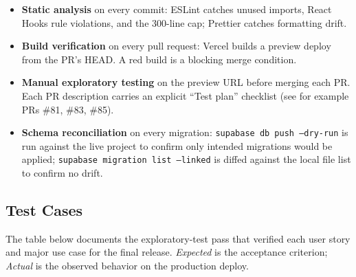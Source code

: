 \documentclass[11pt,letterpaper]{article}
\begin{document}
\begin{itemize}[noitemsep]
  \item \textbf{Static analysis} on every commit: ESLint catches
        unused imports, React Hooks rule violations, and the
        300-line cap; Prettier catches formatting drift.
  \item \textbf{Build verification} on every pull request: Vercel
        builds a preview deploy from the PR's HEAD. A red build is
        a blocking merge condition.
  \item \textbf{Manual exploratory testing} on the preview URL
        before merging each PR. Each PR description carries an
        explicit ``Test plan'' checklist (see for example PRs
        \#81, \#83, \#85).
  \item \textbf{Schema reconciliation} on every migration:
        \texttt{supabase db push --dry-run} is run against the
        live project to confirm only intended migrations would be
        applied; \texttt{supabase migration list --linked} is
        diffed against the local file list to confirm no drift.
\end{itemize}

\subsection{Test Cases}

The table below documents the exploratory-test pass that
verified each user story and major use case for the final
release. \textit{Expected} is the acceptance criterion;
\textit{Actual} is the observed behavior on the production
deploy.
\end{document}
